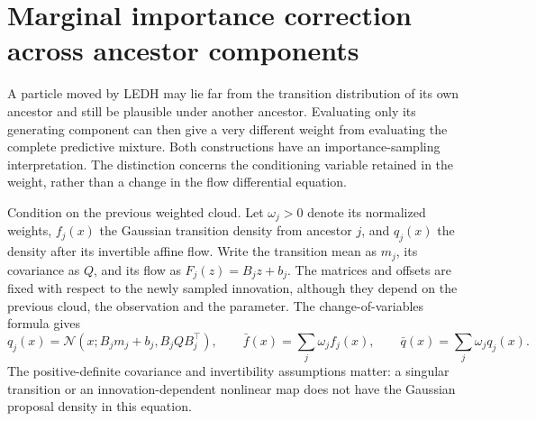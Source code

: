 \section[Marginal importance correction]{Marginal importance correction across ancestor components}
\label{sec:bf-hd-marginal-importance-correction}

A particle moved by LEDH may lie far from the transition distribution of its
own ancestor and still be plausible under another ancestor.  Evaluating only
its generating component can then give a very different weight from evaluating
the complete predictive mixture.  Both constructions have an importance-sampling
interpretation.  The distinction concerns the conditioning variable retained in
the weight, rather than a change in the flow differential equation.

Condition on the previous weighted cloud.  Let $\omega_j>0$ denote its normalized
weights, $f_j(x)$ the Gaussian transition density from ancestor $j$, and
$q_j(x)$ the density after its invertible affine flow.  Write the transition
mean as $m_j$, its covariance as $Q$, and its flow as $F_j(z)=B_jz+b_j$.
The matrices and offsets are fixed with respect to the newly sampled innovation,
although they depend on the previous cloud, the observation and the parameter.
The change-of-variables formula gives
\begin{equation}
 q_j(x)=\mathcal N(x;B_jm_j+b_j,B_jQB_j^\top),\qquad
 \bar f(x)=\sum_j\omega_j f_j(x),\qquad
 \bar q(x)=\sum_j\omega_j q_j(x).
 \label{eq:bf-hd-marginal-component-densities}
\end{equation}
The positive-definite covariance and invertibility assumptions matter: a
singular transition or an innovation-dependent nonlinear map does not have the
Gaussian proposal density in this equation.

